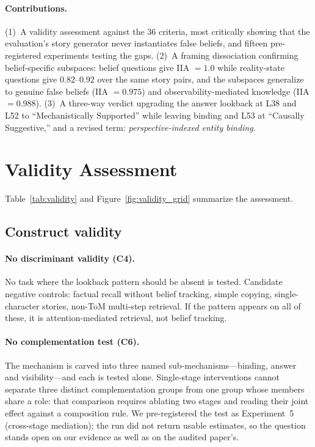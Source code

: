 \documentclass{article}
\begin{document}
\paragraph{Contributions.}
(1)~A validity assessment against the 36 criteria, most critically showing that the evaluation's story generator never instantiates false beliefs, and fifteen pre-registered experiments testing the gaps.
(2)~A framing dissociation confirming belief-specific subspaces: belief questions give IIA $= 1.0$ while reality-state questions give $0.82$--$0.92$ over the same story pairs, and the subspaces generalize to genuine false beliefs (IIA $= 0.975$) and observability-mediated knowledge (IIA $= 0.988$).
(3)~A three-way verdict upgrading the answer lookback at L38 and L52 to ``Mechanistically Supported'' while leaving binding and L53 at ``Causally Suggestive,'' and a revised term: \emph{perspective-indexed entity binding}.


\section{Validity Assessment}
\label{sec:validity}

Table~\ref{tab:validity} and Figure~\ref{fig:validity_grid} summarize the assessment.

\subsection{Construct validity}

\paragraph{No discriminant validity (C4).}
No task where the lookback pattern should be absent is tested. Candidate negative controls: factual recall without belief tracking, simple copying, single-character stories, non-ToM multi-step retrieval. If the pattern appears on all of these, it is attention-mediated retrieval, not belief tracking.

\paragraph{No complementation test (C6).}
The mechanism is carved into three named sub-mechanisms---binding, answer and
visibility---and each is tested alone. Single-stage interventions cannot separate three
distinct complementation groups from one group whose members share a role: that comparison
requires ablating two stages and reading their joint effect against a composition rule. We
pre-registered the test as Experiment~5 (cross-stage mediation); the run did not return
usable estimates, so the question stands open on our evidence as well as on the audited
paper's.
\end{document}
